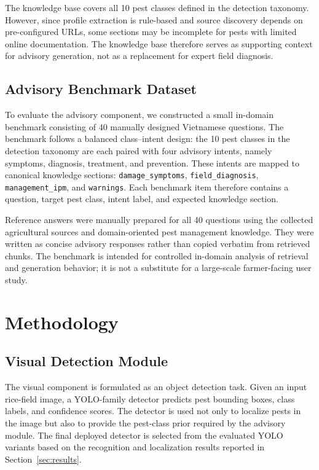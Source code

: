 ﻿\documentclass[11pt]{article}
\begin{document}
The knowledge base covers all 10 pest classes defined in the
detection taxonomy. However, since profile extraction is rule-based
and source discovery depends on pre-configured URLs, some sections
may be incomplete for pests with limited online documentation.
The knowledge base therefore serves as supporting context for
advisory generation, not as a replacement for expert field diagnosis.

\subsection{Advisory Benchmark Dataset}
\label{sec:advisory_benchmark}

To evaluate the advisory component, we constructed a small in-domain
benchmark consisting of 40 manually designed Vietnamese questions.
The benchmark follows a balanced class--intent design: the 10 pest
classes in the detection taxonomy are each paired with four advisory
intents, namely symptoms, diagnosis, treatment, and prevention. These
intents are mapped to canonical knowledge sections:
\texttt{damage\_symptoms}, \texttt{field\_diagnosis},
\texttt{management\_ipm}, and \texttt{warnings}. Each benchmark item
therefore contains a question, target pest class, intent label, and
expected knowledge section.

Reference answers were manually prepared for all 40 questions using
the collected agricultural sources and domain-oriented pest management
knowledge. They were written as concise advisory responses rather
than copied verbatim from retrieved chunks. The benchmark is intended
for controlled in-domain analysis of retrieval and generation behavior;
it is not a substitute for a large-scale farmer-facing user study.

\section{Methodology}
\label{sec:methodology}

\subsection{Visual Detection Module}

The visual component is formulated as an object detection task. Given an input rice-field image, a YOLO-family detector predicts pest bounding boxes, class labels, and confidence scores. The detector is used not only to localize pests in the image but also to provide the pest-class prior required by the advisory module. The final deployed detector is selected from the evaluated YOLO variants based on the recognition and localization results reported in Section~\ref{sec:results}.
\end{document}
